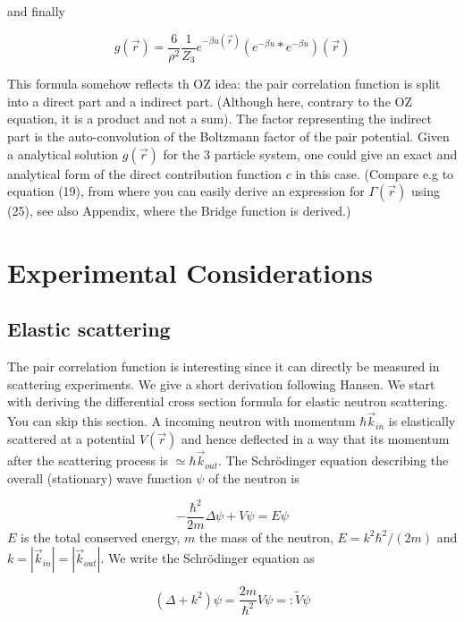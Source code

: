 \documentclass[11pt,a4paper]{article}
\begin{document}
and finally

\begin{equation}
g(\vec r) =
\frac{6}{\rho^2}\frac{1}{Z_3} e^{- \beta u( \vec r) }
(e^{- \beta u} *e^{- \beta u}) (\vec r)
\end{equation}

This formula somehow reflects th OZ idea: the pair correlation function is split into a direct part and a indirect part. (Although here,
contrary to the OZ equation, it is a product and not a sum). The factor representing the indirect part is the auto-convolution 
of the Boltzmann factor of the pair potential. \newline Given a analytical solution $g(\vec r)$ for the 3 particle system, 
one could give an exact and analytical form of the direct contribution function $c$ in this case. 
(Compare e.g to equation (19), from where you can easily derive an expression for $\Gamma(\vec r)$ using (25), see also Appendix,
where the Bridge function is derived.)

\section{Experimental Considerations}
\subsection{Elastic scattering}
The pair correlation function is interesting since it can directly be measured in scattering experiments. We give a short derivation following Hansen.
We start with deriving the differential cross section formula for elastic neutron scattering. You can skip this section. \newline
A incoming neutron with momentum $\hbar \vec k_{in}$ is elastically scattered at a potential $V(\vec r)$ and hence deflected in a way that its momentum
after the scattering process is $\simeq \hbar \vec k_{out}$. The Schr\"odinger equation describing the overall (stationary) wave function $\psi$ of the neutron is


\begin{equation}
-\frac{ \hbar^2}{2m}\Delta \psi + V \psi = E \psi
\end{equation}
$E$ is the total conserved energy, $m$ the mass of the neutron, $E = k^2\hbar^2/(2m)$ and $k = |\vec k_{in}| = |\vec k_{out}|$. 
We write the Schr\"odinger equation as

\begin{equation}
(\Delta + k^ 2) \psi = \frac{ 2m}{\hbar^2} V \psi =: \tilde V \psi
\end{equation}
\end{document}
